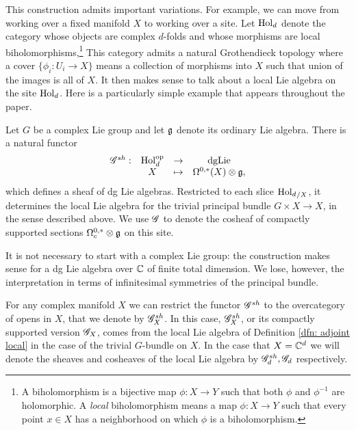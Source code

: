 This construction admits important variations.
For example, we can move from working over a fixed manifold $X$ to working over a site.
Let ${\rm Hol}_d$ denote the category whose objects are complex $d$-folds and whose morphisms are local biholomorphisms,\footnote{A biholomorphism is a bijective map $\phi: X \to Y$ such that both $\phi$ and $\phi^{-1}$ are holomorphic. A {\em local} biholomorphism means a map $\phi: X \to Y$ such that every point $x \in X$ has a neighborhood on which $\phi$ is a biholomorphism.}
This category admits a natural Grothendieck topology where a cover $\{\phi_i: U_i \to X\}$ means a collection of morphisms into $X$ such that union of the images is all of $X$.
It then makes sense to talk about a local Lie algebra on the site ${\rm Hol}_d$.
Here is a particularly simple example that appears throughout the paper.

\begin{dfn}
Let $G$ be a complex Lie group and let $\mathfrak g$ denote its ordinary Lie algebra.
There is a natural functor 
\[
\begin{array}{cccc}
\mathscr G^{sh} :&  {\rm Hol}_d^{\rm op} & \to & {{\rm dgLie}}\\
& X & \mapsto &\Omega^{0,*}(X) \otimes \mathfrak g,
\end{array}
\]
which defines a sheaf of dg Lie algebras.
Restricted to each slice ${{\rm Hol}_d}_{/X}$, it determines the local Lie algebra for the trivial principal bundle $G \times X \to X$, in the sense described above.
We use $\mathscr G$ to denote the cosheaf of compactly supported sections $\Omega^{0,*}_c \otimes \mathfrak g$ on this site.
\end{dfn}


\begin{rmk}
It is not necessary to start with a complex Lie group: 
the construction makes sense for a dg Lie algebra over $\mathbb C$ of finite total dimension.
We lose, however, the interpretation in terms of infinitesimal symmetries of the principal bundle.
\end{rmk}

\begin{rmk}
For any complex manifold $X$ we can restrict the functor $\mathscr G^{sh}$ to the overcategory of opens in $X$, that we denote by $\mathscr G^{sh}_X$. 
In this case, $\mathscr G^{sh}_X$, or its compactly supported version $\mathscr G_X$, comes from the local Lie algebra of Definition \ref{dfn: adjoint local} in the case of the trivial $G$-bundle on $X$. 
In the case that $X = \mathbb C^d$ we will denote the sheaves and cosheaves of the local Lie algebra by $\mathscr G_d^{sh}, \mathscr G_d$ respectively.
\end{rmk}

